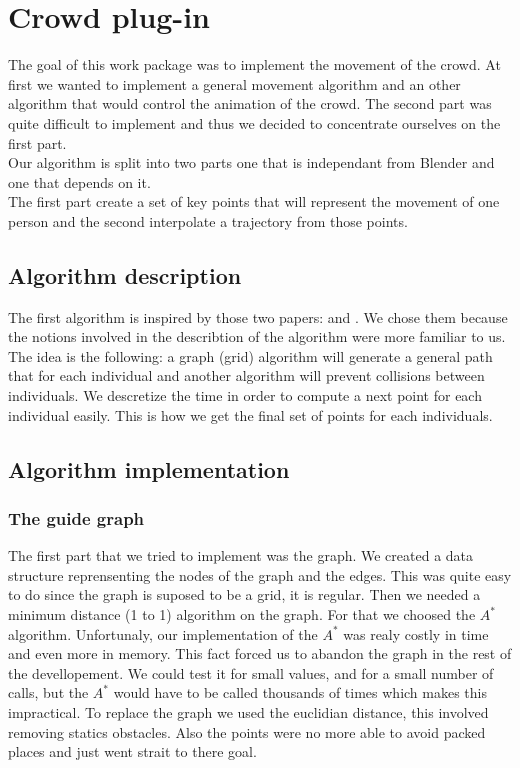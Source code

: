 \section{Crowd plug-in}

The goal of this work package was to implement the movement of the crowd. At first we wanted to implement a general movement algorithm and an other algorithm that would control the animation of the crowd. The second part was quite difficult to implement and thus we decided to concentrate ourselves on the first part.\\
Our algorithm is split into two parts one that is independant from Blender and one that depends on it. \\
The first part create a set of key points that will represent the movement of one person and the second interpolate a trajectory from those points.

\subsection{Algorithm description}

The first algorithm is inspired by those two papers: \cite{PLE} and \cite{vandenBerg2011}. We chose them because the notions involved in the describtion of the algorithm were more familiar to us.
The idea is the following: a graph (grid) algorithm will generate a general path that for each individual and another algorithm will prevent collisions between individuals. We descretize the time in order to compute a next point for each individual easily. This is how we get the final set of points for each individuals.

\subsection{Algorithm implementation}

\subsubsection{The guide graph}

The first part that we tried to implement was the graph. We created a data structure reprensenting the nodes of the graph and the edges. This was quite easy to do since the graph is suposed to be a grid, it is regular.
Then we needed a minimum distance (1 to 1) algorithm on the graph. For that we choosed the $A^*$ algorithm. Unfortunaly, our implementation of the $A^*$ was realy costly in time and even more in memory. This fact forced us to abandon the graph in the rest of the devellopement. We could test it for small values, and for a small number of calls, but the $A^*$ would have to be called thousands of times which makes this impractical. 
To replace the graph we used the euclidian distance, this involved removing statics obstacles. Also the points were no more able to avoid packed places and just went strait to there goal.

